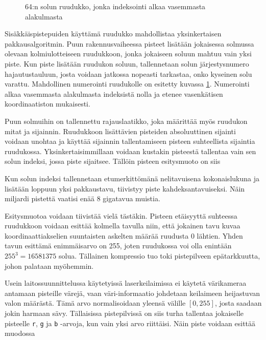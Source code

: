 \begin{figure}
    
    \caption{64:n solun ruudukko, jonka indeksointi alkaa vasemmasta alakulmasta}
    \label{ruudukkokuva}
\end{figure}

Sisäkkäispistepuiden käyttämä ruudukko mahdollistaa yksinkertaisen pakkausalgoritmin. Puun rakennusvaiheessa pisteet lisätään jokaisessa solmussa olevaan kolmiulotteiseen ruudukkoon, jonka jokaiseen soluun mahtuu vain yksi piste. Kun piste lisätään ruudukon soluun, tallennetaan solun järjestysnumero hajautustauluun, josta voidaan jatkossa nopeasti tarkastaa, onko kyseinen solu varattu. Mahdollinen numerointi ruudukolle on esitetty kuvassa \ref{ruudukkokuva}. Numerointi alkaa vasemmasta alakulmasta indeksistä nolla ja etenee vasenkätisen koordinaatiston mukaisesti. 

Puun solmuihin on tallennettu rajauslaatikko, joka määrittää myös ruudukon mitat ja sijainnin. Ruudukkoon lisättävien pisteiden absoluuttinen sijainti voidaan unohtaa ja käyttää sijainnin tallentamiseen pisteen suhteellista sijaintia ruudukossa. Yksinkertaisimmillaan voidaan kustakin pisteestä tallentaa vain sen solun indeksi, jossa piste sijaitsee. Tällöin pisteen esitysmuoto on siis


\noindent Kun solun indeksi tallennetaan etumerkittömänä nelitavuisena kokonaislukuna ja lisätään loppuun yksi pakkaustavu, tiivistyy piste kahdeksantavuiseksi. Näin miljardi pistettä vaatisi enää 8 gigatavua muistia. 

Esitysmuotoa voidaan tiivistää vielä tästäkin. Pisteen etäisyyttä suhteessa ruudukkoon voidaan esittää kolmella tavulla niin, että jokainen tavu kuvaa koordinaattiakselien suuntaisten askelten määrää ruudusta 0 lähtien. Yhden tavun esittämä enimmäisarvo on 255, joten ruudukossa voi olla enintään $255^3=16581375$ solua. Tällainen kompressio tuo toki pistepilveen epätarkkuutta, johon palataan myöhemmin. %

Usein laitossuunnittelussa käytetyissä laserkeilaimissa ei käytetä värikameraa antamaan pisteille värejä, vaan väri-informaatio johdetaan keilaimeen heijastuvan valon määrästä. Tämä arvo normalisoidaan yleensä välille $[0,255]$, josta saadaan jokin harmaan sävy. Tällaisissa pistepilvissä on siis turha tallentaa jokaiselle pisteelle \texttt{r}, \texttt{g} ja \texttt{b} -arvoja, kun vain yksi arvo riittäisi. Näin piste voidaan esittää muodossa 

